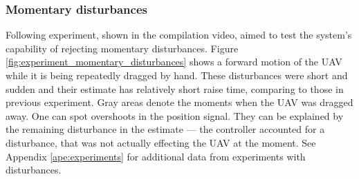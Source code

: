 \subsubsection{Momentary disturbances}
\label{cap:momentary_disturbances}

Following experiment, shown in the compilation video, aimed to test the system's capability of rejecting momentary disturbances. Figure \ref{fig:experiment_momentary_disturbances} shows a forward motion of the UAV while it is being repeatedly dragged by hand. These disturbances were short and sudden and their estimate has relatively short raise time, comparing to those in previous experiment. Gray areas denote the moments when the UAV was dragged away. One can spot overshoots in the position signal. They can be explained by the remaining disturbance in the estimate --- the controller accounted for a disturbance, that was not actually effecting the UAV at the moment. See Appendix \ref{ape:experiments} for additional data from experiments with disturbances.

